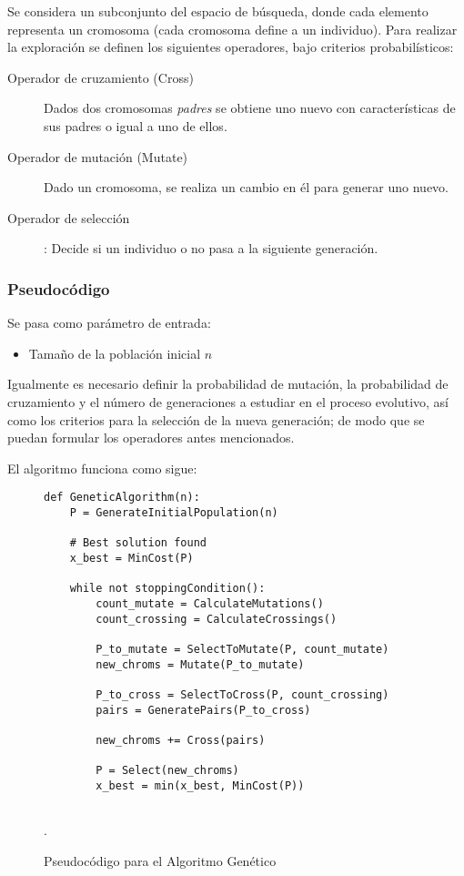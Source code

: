 \documentclass[titlepage, 11pt]{scrartcl}
\begin{document}
	    	Se considera un subconjunto del espacio de búsqueda, donde cada elemento representa un cromosoma (cada cromosoma define a un individuo). Para realizar la exploración se definen los siguientes operadores, bajo criterios probabilísticos:
	    	\begin{description}
	    		\item[Operador de cruzamiento (Cross)] Dados dos cromosomas \textit{padres} se obtiene uno nuevo con características de sus padres o igual a uno de ellos.
	    		\item[Operador de mutación (Mutate)] Dado un cromosoma, se realiza un cambio en él para generar uno nuevo.
	    		\item[Operador de selección]: Decide si un individuo o no pasa a la siguiente generación.
	    	\end{description}
	    	
	    	\subsubsection{Pseudocódigo}
	    		Se pasa como parámetro de entrada:
	    		\begin{itemize}
	    			\item Tamaño de la población inicial $n$
	    		\end{itemize}
    		
    			Igualmente es necesario definir la probabilidad de mutación, la probabilidad de cruzamiento y el número de generaciones a estudiar en el proceso evolutivo, así como los criterios para la selección de la nueva generación; de modo que se puedan formular los operadores antes mencionados.
	    		
    			El algoritmo funciona como sigue:
	    		\begin{figure}[H]
	    			\begin{verbatim}
def GeneticAlgorithm(n):
	P = GenerateInitialPopulation(n)

	# Best solution found 
	x_best = MinCost(P)
	
	while not stoppingCondition():
		count_mutate = CalculateMutations()
		count_crossing = CalculateCrossings()
		
		P_to_mutate = SelectToMutate(P, count_mutate)
		new_chroms = Mutate(P_to_mutate)
		
		P_to_cross = SelectToCross(P, count_crossing)
		pairs = GeneratePairs(P_to_cross)
		
		new_chroms += Cross(pairs)
		
		P = Select(new_chroms)
		x_best = min(x_best, MinCost(P))
		    	
	    			\end{verbatim}
	    			\caption{Pseudocódigo para el Algoritmo Genético}.
    			\end{figure}
	    	
\end{document}
